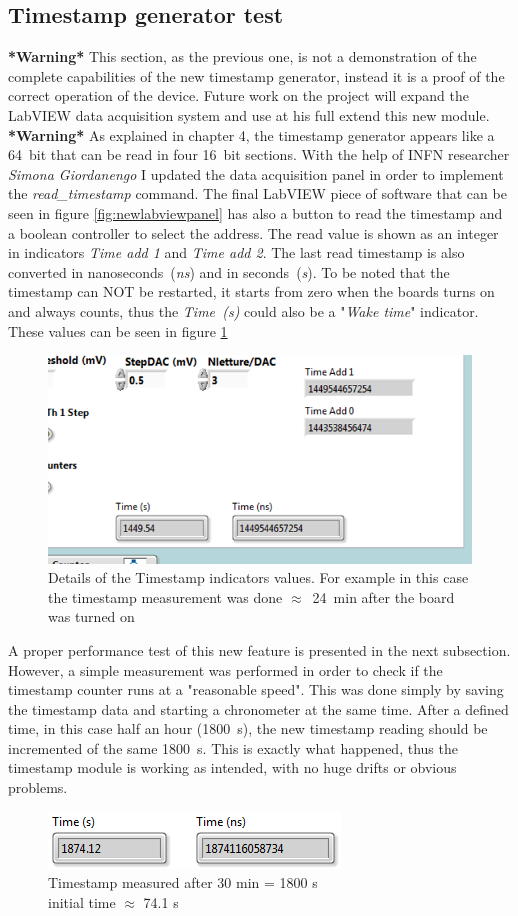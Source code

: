 \subsection{Timestamp generator test}
\noindent \textbf{*Warning*} This section, as the previous one, is not a demonstration of the complete capabilities of the new timestamp generator, instead it is a proof of the correct operation of the device. Future work on the project will expand the LabVIEW data acquisition system and use at his full extend this new module. \textbf{*Warning*}
\newline
As explained in chapter 4, the timestamp generator appears like a 64~bit that can be read in four 16~bit sections.
With the help of INFN researcher \textit{Simona Giordanengo} I updated the data acquisition panel in order to implement the \textit{read\_timestamp} command.
The final LabVIEW piece of software that can be seen in figure \ref{fig:newlabviewpanel} has also a button to read the timestamp and a boolean controller to select the address.
The read value is shown as an integer in indicators \textit{Time add 1} and \textit{Time add 2}. The last read timestamp is also converted in nanoseconds~(\textit{ns}) and in seconds~(\textit{s}).
To be noted that the timestamp can NOT be restarted, it starts from zero when the boards turns on and always counts, thus the \textit{Time~(s)} could also be a "\textit{Wake time}" indicator.
These values can be seen in figure \ref{fig:timestampfigure}
\begin{figure}[H]
	\centering
	\includegraphics[width=0.5\linewidth]{IMG/ch5/latch_tests/fig15.PNG}
	\caption{Details of the Timestamp indicators values. For example in this case the timestamp measurement was done $\approx$~24~min after the board was turned on}
	\label{fig:timestampfigure}
\end{figure}
\noindent A proper performance test of this new feature is presented in the next subsection. However, a simple measurement was performed in order to check if the timestamp counter runs at a "reasonable speed".
This was done simply by saving the timestamp data and starting a chronometer at the same time. After a defined time, in this case half an hour (1800~s), the new timestamp reading should be incremented of the same 1800~s.
This is exactly what happened, thus the timestamp module is working as intended, with no huge drifts or obvious problems.  
\begin{figure}[H]
	\centering
	\includegraphics[width=0.35\linewidth]{IMG/ch5/latch_tests/fig20.PNG}
	\caption{Timestamp measured after 30 min = 1800 s\\initial time $\approx$ 74.1 s}
	\label{fig:timestamptest}
\end{figure}

